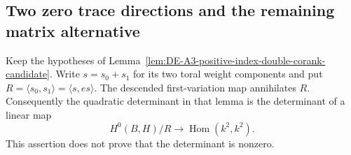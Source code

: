 \subsection{Two zero trace directions and the remaining matrix alternative}

\begin{lemma}
\label{lem:DE-A3-positive-trace-radical}
Keep the hypotheses of
Lemma~\ref{lem:DE-A3-positive-index-double-corank-candidate}.
Write $s=s_0+s_1$ for its two toral weight components and put
$R=\langle s_0,s_1\rangle=\langle s,es\rangle$.
The descended first-variation map annihilates $R$. Consequently
the quadratic determinant in that lemma is the determinant of
a linear map
\[
       H^0(B,H)/R\longrightarrow\operatorname{Hom}(k^2,k^2).
\]
This assertion does not prove that the determinant is nonzero.
\end{lemma}
